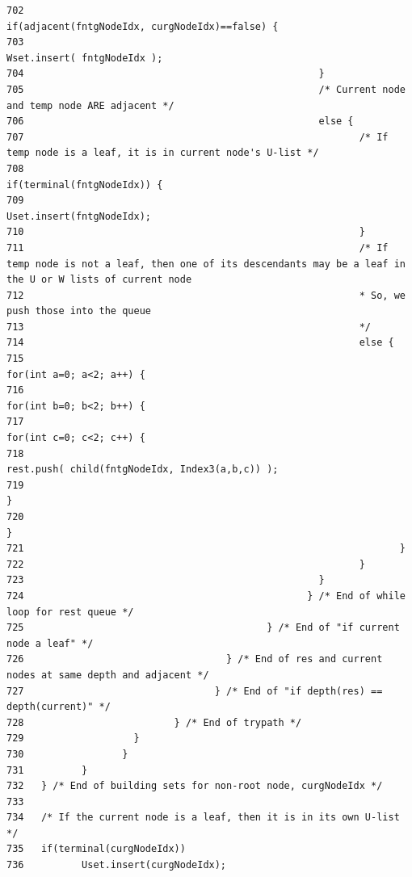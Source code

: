 \begin{verbatim}
702                                                   if(adjacent(fntgNodeIdx, curgNodeIdx)==false) {
703                                                          Wset.insert( fntgNodeIdx );
704                                                   }
705                                                   /* Current node and temp node ARE adjacent */
706                                                   else {
707                                                          /* If temp node is a leaf, it is in current node's U-list */
708                                                          if(terminal(fntgNodeIdx)) {
709                                                                 Uset.insert(fntgNodeIdx);
710                                                          }
711                                                          /* If temp node is not a leaf, then one of its descendants may be a leaf in the U or W lists of current node
712                                                          * So, we push those into the queue
713                                                          */
714                                                          else { 
715                                                                 for(int a=0; a<2; a++) {
716                                                                   for(int b=0; b<2; b++) {
717                                                                          for(int c=0; c<2; c++) {
718                                                                                 rest.push( child(fntgNodeIdx, Index3(a,b,c)) );
719                                                                          }
720                                                                   }
721                                                                 }
722                                                          }
723                                                   }
724                                                 } /* End of while loop for rest queue */
725                                          } /* End of "if current node a leaf" */ 
726                                   } /* End of res and current nodes at same depth and adjacent */
727                                 } /* End of "if depth(res) == depth(current)" */
728                          } /* End of trypath */
729                   }
730                 }
731          }
732   } /* End of building sets for non-root node, curgNodeIdx */
733 
734   /* If the current node is a leaf, then it is in its own U-list */
735   if(terminal(curgNodeIdx))
736          Uset.insert(curgNodeIdx);

\end{verbatim}
